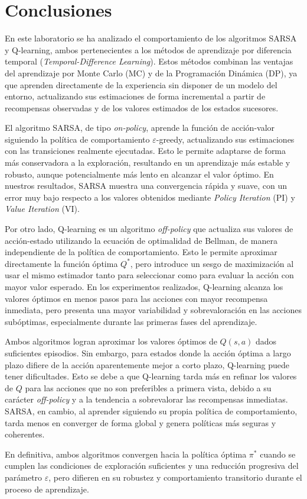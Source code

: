 \documentclass[a4paper,12pt]{article}
\begin{document}
\section{Conclusiones}

En este laboratorio se ha analizado el comportamiento de los algoritmos SARSA y Q-learning, ambos pertenecientes a los métodos de aprendizaje por diferencia temporal (\textit{Temporal-Difference Learning}). Estos métodos combinan las ventajas del aprendizaje por Monte Carlo (MC) y de la Programación Dinámica (DP), ya que aprenden directamente de la experiencia sin disponer de un modelo del entorno, actualizando sus estimaciones de forma incremental a partir de recompensas observadas y de los valores estimados de los estados sucesores. 

El algoritmo SARSA, de tipo \textit{on-policy}, aprende la función de acción-valor siguiendo la política de comportamiento $\varepsilon$-greedy, actualizando sus estimaciones con las transiciones realmente ejecutadas. Esto le permite adaptarse de forma más conservadora a la exploración, resultando en un aprendizaje más estable y robusto, aunque potencialmente más lento en alcanzar el valor óptimo. En nuestros resultados, SARSA muestra una convergencia rápida y suave, con un error muy bajo respecto a los valores obtenidos mediante \textit{Policy Iteration} (PI) y \textit{Value Iteration} (VI).

Por otro lado, Q-learning es un algoritmo \textit{off-policy} que actualiza sus valores de acción-estado utilizando la ecuación de optimalidad de Bellman, de manera independiente de la política de comportamiento. Esto le permite aproximar directamente la función óptima $Q^*$, pero introduce un sesgo de maximización al usar el mismo estimador tanto para seleccionar como para evaluar la acción con mayor valor esperado. En los experimentos realizados, Q-learning alcanza los valores óptimos en menos pasos para las acciones con mayor recompensa inmediata, pero presenta una mayor variabilidad y sobrevaloración en las acciones subóptimas, especialmente durante las primeras fases del aprendizaje.

Ambos algoritmos logran aproximar los valores óptimos de $Q(s, a)$ dados suficientes episodios. Sin embargo, para estados donde la acción óptima a largo plazo difiere de la acción aparentemente mejor a corto plazo, Q-learning puede tener dificultades. Esto se debe a que Q-learning tarda más en refinar los valores de $Q$ para las acciones que no son preferibles a primera vista, debido a su carácter \textit{off-policy} y a la tendencia a sobrevalorar las recompensas inmediatas. SARSA, en cambio, al aprender siguiendo su propia política de comportamiento, tarda menos en converger de forma global y genera políticas más seguras y coherentes.

En definitiva, ambos algoritmos convergen hacia la política óptima $\pi^*$ cuando se cumplen las condiciones de exploración suficientes y una reducción progresiva del parámetro $\varepsilon$, pero difieren en su robustez y comportamiento transitorio durante el proceso de aprendizaje.
\end{document}
